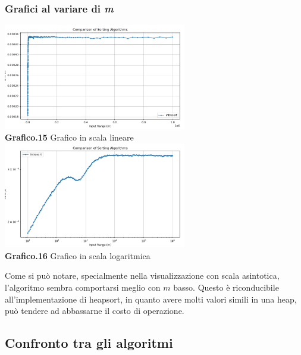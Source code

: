 \documentclass{article}
\begin{document}
        \subsubsection{Grafici al variare di \textit{m}}
            \begin{center}
                \includegraphics[width=0.6\textwidth]{Introsort_InputRange.png} \\
                \textbf{Grafico.15} Grafico in scala lineare\\
                \vspace{0.5cm}
                \includegraphics[width=0.6\textwidth]{Introsort_InputRange_Log.png} \\
                \textbf{Grafico.16} Grafico in scala logaritmica\\
            \end{center}
            Come si può notare, specialmente nella visualizzazione con scala asintotica, l'algoritmo sembra comportarsi meglio con $m$ basso. Questo è riconducibile all'implementazione di heapsort, in quanto avere molti valori simili in una heap, può tendere ad abbassarne il costo di operazione.
            
    \subsection{Confronto tra gli algoritmi}
\end{document}
